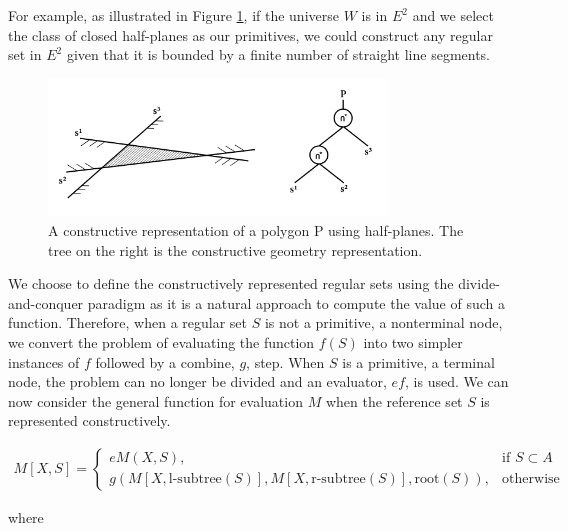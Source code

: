 \documentclass[a4paper,11pt,oneside]{article}
\begin{document}
For example, as illustrated in Figure \ref{sect3:halfplane-csg}, if the universe $W$ is in $E^2$ and we select the class of closed half-planes as our primitives, we could construct any regular set in $E^2$ given that it is bounded by a finite number of straight line segments.

\begin{figure}[ht]
	\begin{center}
		\includegraphics[width=0.8\textwidth]{section3/3.2/halfplane-csg.png}
	\end{center}
	\caption{A constructive representation of a polygon P using half-planes. The tree on the right is the constructive geometry representation.}
	\label{sect3:halfplane-csg}
\end{figure}

We choose to define the constructively represented regular sets using the divide-and-conquer paradigm as it is a natural approach to compute the value of such a function. Therefore, when a regular set $S$ is not a primitive, a nonterminal node, we convert the problem of evaluating the function $f(S)$ into two simpler instances of $f$ followed by a combine, $g$, step. When $S$ is a primitive, a terminal node, the problem can no longer be divided and an evaluator, $ef$, is used. We can now consider the general function for evaluation $M$ when the reference set $S$ is represented constructively.

\begin{align}
	M[X,S]= 
	\begin{cases}
	eM(X, S),                                                                & \text{if } S \subset A \\
	g(M[X, \text{l-subtree}(S)], M[X, \text{r-subtree}(S)], \text{root}(S)), & \text{otherwise}       
	\end{cases}
\end{align}

where
\end{document}
